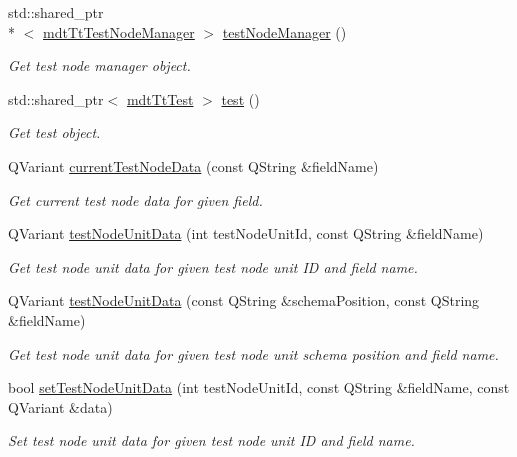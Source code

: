 \begin{DoxyCompactItemize}
std\-::shared\-\_\-ptr\\*
$<$ \hyperlink{classmdt_tt_test_node_manager}{mdt\-Tt\-Test\-Node\-Manager} $>$ \hyperlink{classmdt_tt_abstract_test_node_calibration_tool_aeba30ff3f083a8a3c65dce704b132ba7}{test\-Node\-Manager} ()
\begin{DoxyCompactList}\small\item\em Get test node manager object. \end{DoxyCompactList}\item 
std\-::shared\-\_\-ptr$<$ \hyperlink{classmdt_tt_test}{mdt\-Tt\-Test} $>$ \hyperlink{classmdt_tt_abstract_test_node_calibration_tool_ab3db9df8cd757adca0dabf085a31374e}{test} ()
\begin{DoxyCompactList}\small\item\em Get test object. \end{DoxyCompactList}\item 
Q\-Variant \hyperlink{classmdt_tt_abstract_test_node_calibration_tool_a42d8aaef4d70f5afe2eca46f3d1ed32b}{current\-Test\-Node\-Data} (const Q\-String \&field\-Name)
\begin{DoxyCompactList}\small\item\em Get current test node data for given field. \end{DoxyCompactList}\item 
Q\-Variant \hyperlink{classmdt_tt_abstract_test_node_calibration_tool_ab9303ff1fa75268af20c920e5c14ef8a}{test\-Node\-Unit\-Data} (int test\-Node\-Unit\-Id, const Q\-String \&field\-Name)
\begin{DoxyCompactList}\small\item\em Get test node unit data for given test node unit I\-D and field name. \end{DoxyCompactList}\item 
Q\-Variant \hyperlink{classmdt_tt_abstract_test_node_calibration_tool_a56ea21dd9edf2abb6be1c4bf872f13c0}{test\-Node\-Unit\-Data} (const Q\-String \&schema\-Position, const Q\-String \&field\-Name)
\begin{DoxyCompactList}\small\item\em Get test node unit data for given test node unit schema position and field name. \end{DoxyCompactList}\item 
bool \hyperlink{classmdt_tt_abstract_test_node_calibration_tool_a0e1be9284aaa5ac0ac836d3b81db0616}{set\-Test\-Node\-Unit\-Data} (int test\-Node\-Unit\-Id, const Q\-String \&field\-Name, const Q\-Variant \&data)
\begin{DoxyCompactList}\small\item\em Set test node unit data for given test node unit I\-D and field name. \end{DoxyCompactList}\item 

\end{DoxyCompactItemize}

